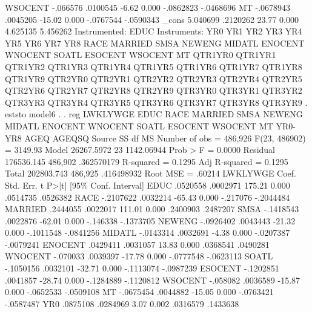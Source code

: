      WSOCENT {\VBAR}   -.066576   .0100545    -6.62   0.000    -.0862823   -.0468696
          MT {\VBAR}  -.0678943   .0045205   -15.02   0.000    -.0767544   -.0590343
       _cons {\VBAR}   5.040699   .2120262    23.77   0.000     4.625135    5.456262
Instrumented:  EDUC
Instruments:   YR0 YR1 YR2 YR3 YR4 YR5 YR6 YR7 YR8 RACE MARRIED SMSA NEWENG
               MIDATL ENOCENT WNOCENT SOATL ESOCENT WSOCENT MT QTR1YR0
               QTR1YR1 QTR1YR2 QTR1YR3 QTR1YR4 QTR1YR5 QTR1YR6 QTR1YR7
               QTR1YR8 QTR1YR9 QTR2YR0 QTR2YR1 QTR2YR2 QTR2YR3 QTR2YR4
               QTR2YR5 QTR2YR6 QTR2YR7 QTR2YR8 QTR2YR9 QTR3YR0 QTR3YR1
               QTR3YR2 QTR3YR3 QTR3YR4 QTR3YR5 QTR3YR6 QTR3YR7 QTR3YR8
               QTR3YR9
{\smallskip}
. eststo model6
{\smallskip}
. 
. reg  LWKLYWGE EDUC  RACE MARRIED SMSA NEWENG MIDATL ENOCENT WNOCENT SOATL ESOCENT WSOCENT MT YR0-YR8 AGEQ AGEQSQ 
{\smallskip}
      Source {\VBAR}       SS           df       MS      Number of obs   =   486,926
   F(23, 486902)   =   3149.93
       Model {\VBAR}  26267.5972        23  1142.06944   Prob > F        =    0.0000
    Residual {\VBAR}  176536.145   486,902  .362570179   R-squared       =    0.1295
   Adj R-squared   =    0.1295
       Total {\VBAR}  202803.743   486,925  .416498932   Root MSE        =    .60214
{\smallskip}
    LWKLYWGE {\VBAR}      Coef.   Std. Err.      t    P>|t|     [95\% Conf. Interval]
        EDUC {\VBAR}   .0520558   .0002971   175.21   0.000     .0514735    .0526382
        RACE {\VBAR}  -.2107622   .0032214   -65.43   0.000     -.217076   -.2044484
     MARRIED {\VBAR}   .2444055   .0022017   111.01   0.000     .2400903    .2487207
        SMSA {\VBAR}  -.1418543   .0022876   -62.01   0.000     -.146338   -.1373705
      NEWENG {\VBAR}  -.0926402   .0043443   -21.32   0.000    -.1011548   -.0841256
      MIDATL {\VBAR}  -.0143314   .0032691    -4.38   0.000    -.0207387   -.0079241
     ENOCENT {\VBAR}   .0429411   .0031057    13.83   0.000     .0368541    .0490281
     WNOCENT {\VBAR}   -.070033   .0039397   -17.78   0.000    -.0777548   -.0623113
       SOATL {\VBAR}  -.1050156   .0032101   -32.71   0.000    -.1113074   -.0987239
     ESOCENT {\VBAR}  -.1202851   .0041857   -28.74   0.000    -.1284889   -.1120812
     WSOCENT {\VBAR}   -.058082   .0036589   -15.87   0.000    -.0652533   -.0509108
          MT {\VBAR}  -.0675454   .0044882   -15.05   0.000    -.0763421   -.0587487
         YR0 {\VBAR}   .0875108   .0284969     3.07   0.002     .0316579    .1433638
